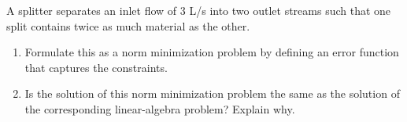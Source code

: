 %

\begin{exercise} %
    A splitter separates an inlet flow of 3 L/s into two outlet streams such that one split contains twice as much material as the other.
    \begin{enumerate}[label=(\alph*)]
        \item Formulate this as a norm minimization problem by defining an error function that captures the constraints.
        \item Is the solution of this norm minimization problem the same as the solution of the corresponding linear-algebra problem? Explain why.
    \end{enumerate}
\end{exercise}

